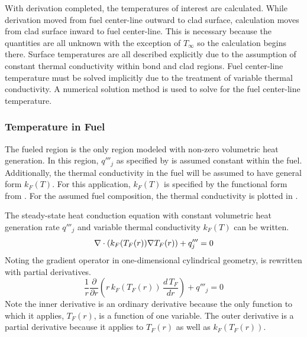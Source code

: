     With derivation completed, the temperatures of interest are calculated.
    While derivation moved from fuel center-line outward to clad surface,
    calculation moves from clad surface inward to fuel center-line. This is
    necessary because the quantities are all unknown with the exception of
    $T_{\infty}$ so the calculation begins there. Surface temperatures are all
    described explicitly due to the assumption of constant thermal conductivity
    within bond and clad regions. Fuel center-line temperature must be solved
    implicitly due to the treatment of variable thermal conductivity. A
    numerical solution method is used to solve for the fuel center-line
    temperature.
    
    \subsubsection{Temperature in Fuel}
      The fueled region is the only region modeled with non-zero volumetric heat
      generation. In this region, $q'''_j$ as specified by 
       is assumed constant within the fuel. 
      Additionally, the thermal conductivity in the fuel will be assumed to have
      general form $k_F(T)$. For this application, $k_F(T)$ is specified by the
      functional form from \cite{fuelProp}. For the assumed fuel composition, 
      the thermal conductivity is plotted in .

      The steady-state heat conduction equation with constant volumetric heat
      generation rate $q'''_j$ and variable thermal conductivity $k_F(T)$ can be
      written.
      \begin{equation}
        \label{eq:conduction_fuel}
        \mathbf{\nabla} \cdot (k_F(T_F(r)) \mathbf{\nabla} T_F(r)) + q'''_j = 0
      \end{equation}
      Noting the gradient operator in one-dimensional cylindrical geometry,
       is rewritten with partial derivatives.
      \begin{equation}
        \label{eq:conduction_fuel_cylindrical}
        \frac{1}{r} \frac{\partial}{\partial r} \left( r \, k_F(T_F(r)) \, 
          \frac{d \, T_F}{dr} \right) + q'''_j = 0
      \end{equation}
      Note the inner derivative is an ordinary derivative because the only
      function to which it applies, $T_F(r)$, is a function of one variable. The
      outer derivative is a partial derivative because it applies to $T_F(r)$ as
      well as $k_F(T_F(r))$.

